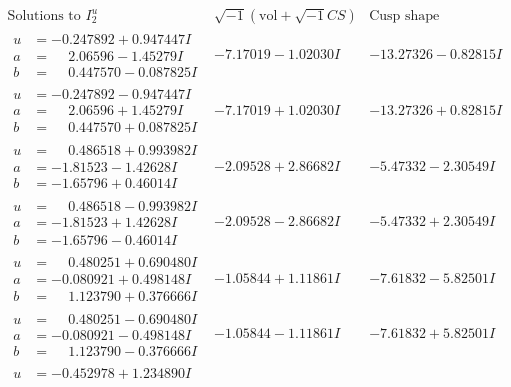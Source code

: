 \documentclass[1p]{elsarticle_modified}
\theoremstyle{definition}
\newcommand{\I}{\sqrt{-1}}
\begin{document}
$$\begin{array}{c|c|c}  
\text{Solutions to }I^u_{2}& \I (\text{vol} + \sqrt{-1}CS) & \text{Cusp shape}\\
 \hline 
\begin{aligned}
u &= -0.247892 + 0.947447 I \\
a &= \phantom{-}2.06596 - 1.45279 I \\
b &= \phantom{-}0.447570 - 0.087825 I\end{aligned}
 & -7.17019 - 1.02030 I & -13.27326 - 0.82815 I \\ \hline\begin{aligned}
u &= -0.247892 - 0.947447 I \\
a &= \phantom{-}2.06596 + 1.45279 I \\
b &= \phantom{-}0.447570 + 0.087825 I\end{aligned}
 & -7.17019 + 1.02030 I & -13.27326 + 0.82815 I \\ \hline\begin{aligned}
u &= \phantom{-}0.486518 + 0.993982 I \\
a &= -1.81523 - 1.42628 I \\
b &= -1.65796 + 0.46014 I\end{aligned}
 & -2.09528 + 2.86682 I & -5.47332 - 2.30549 I \\ \hline\begin{aligned}
u &= \phantom{-}0.486518 - 0.993982 I \\
a &= -1.81523 + 1.42628 I \\
b &= -1.65796 - 0.46014 I\end{aligned}
 & -2.09528 - 2.86682 I & -5.47332 + 2.30549 I \\ \hline\begin{aligned}
u &= \phantom{-}0.480251 + 0.690480 I \\
a &= -0.080921 + 0.498148 I \\
b &= \phantom{-}1.123790 + 0.376666 I\end{aligned}
 & -1.05844 + 1.11861 I & -7.61832 - 5.82501 I \\ \hline\begin{aligned}
u &= \phantom{-}0.480251 - 0.690480 I \\
a &= -0.080921 - 0.498148 I \\
b &= \phantom{-}1.123790 - 0.376666 I\end{aligned}
 & -1.05844 - 1.11861 I & -7.61832 + 5.82501 I \\ \hline\begin{aligned}
u &= -0.452978 + 1.234890 I \\

\end{aligned}
\end{array}$$
\end{document}
